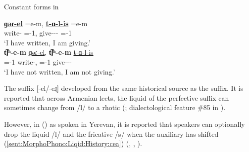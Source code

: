 \begin{exe}
	\ex Constant forms in {\seaSEA}\label{sent:MorphoPhono:Liqid:History:sea}
	\begin{xlist}
		\ex \gll \textbf{\uline{ɡəɾ-el}} \colorbox{lsLightGray}{=e-m}, \textbf{\uline{t-ɑ-l-is}} \colorbox{lsLightGray}{=e-m}
		\\
		write-{\perfcvb} ={\auxgloss}-1{\sg}, give-{\thgloss}-{\infgloss}-{\impfcvb} ={\auxgloss}-1{\sg}
		\\
		\trans `I have written, I am giving.'
		\\
		\ex \gll \textbf{t͡ʃʰ\colorbox{lsLightGray}{-e-m}} \uline{ɡəɾ-el}, \textbf{t͡ʃʰ\colorbox{lsLightGray}{-e-m}} \uline{t-ɑ-l-is}  
		\\
		{\neggloss}={\auxgloss}-1{\sg} write-{\perfcvb}, {\neggloss}={\auxgloss}-1{\sg} give-{\thgloss}-{\infgloss}-{\impfcvb}  
		\\
		\trans `I have not written, I am not giving.'
		\\
	\end{xlist}
\end{exe}

\begin{sloppypar}
The {\iaIA} suffix [-el/-eɻ] developed from the  same historical source as the  {\seaSE} suffix. It is reported that across Armenian lects, the liquid of the perfective suffix    can sometimes change from /l/ to a rhotic (\citealt{grigoryan-2018-FallOfLiquidLPastParticipleInversionSpokenLanguage}; dialectological feature \#85 in \citealt[101]{Jahukyan-1972-ArmenianDiaolectology}). 
\end{sloppypar}

However, in {\seaCEA} (\seaCEAAbbre)  as spoken in Yerevan, it is reported that speakers can optionally drop the liquid /l/ and the fricative /s/ when the auxiliary has shifted (\ref{sent:MorphoPhono:Liqid:History:cea}) (\citealt[101]{Gharagyulyan-1981-ColloquialArmenian}, \citealt[213, 223]{DumTragut-2009-ArmenianReferenceGrammar}, \citealt[37]{KhamoyanEtAl-2014-ColloquialYerevanLanguage}).\pagebreak


